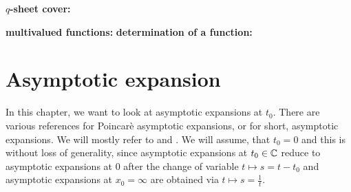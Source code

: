 \textbf{$q$-sheet cover:}

\textbf{multivalued functions:}
\textbf{determination of a function:}

\section{Asymptotic expansion}
\begin{comment}
  \begin{multicols}{2}
    ´classical'
    \begin{itemize}
      \item \cite[60]{sabbah_cimpa90} Chapter II.2.2
        \begin{itemize}
          \item \cite{sabbah2000equations}
        \end{itemize}
      \item \textbf{\textcolor{blue}{Van der Put:
            \cite[Chapter 7]{van2003galois}: Exact Asymptotics}}
      \item \cite{majima1984asymptotic}
      \item \cite{Balser2000Formal}
      \item \cite{Loday1994}
      \item \textbf{\textcolor{blue}{\cite{Loday2014} Chapter 2}}
    \end{itemize}
    \columnbreak
    ´sheafical'
    \begin{itemize}
      \item \textbf{\textcolor{red}{\cite[II.5]{sabbah2007isomonodromic}}}
    \end{itemize}
  \end{multicols}
  \TODO[\cite{sibuya1990Linear} Appendix A.3]
\end{comment}
In this chapter, we want to look at asymptotic expansions at $t_0$.
There are various references for Poincarè asymptotic expansions, or for short,
asymptotic expansions.
We will mostly refer to \cite[chapter 2]{Loday2014} and
\cite[chapter 7]{van2003galois}.
We will assume, that $t_0=0$ and this is without loss of generality, since
asymptotic expansions at $t_0\in\mathbb{C}$ reduce to asymptotic expansions at $0$
after the change of variable $t\mapsto s=t-t_0$ and asymptotic expansions at
$x_0=\infty$ are obtained via $t\mapsto s=\frac{1}{t}$.

